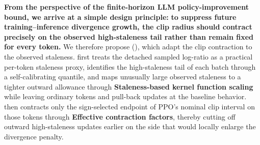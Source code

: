 \textbf{From the perspective of the finite-horizon LLM policy-improvement bound, we arrive at a simple design principle:} \textbf{{to suppress future training--inference divergence growth, the clip radius should contract precisely on the observed high-staleness tail rather than remain fixed for every token.}}
We therefore propose \satrfull{} (\textbf{\satr}), which adapt the clip contraction to the observed staleness. 
\satr{} first treats the detached sampled log-ratio as a practical per-token staleness proxy, identifies the high-staleness tail of each batch through a self-calibrating quantile, and maps unusually large observed staleness to a tighter outward allowance through \textbf{Staleness-based kernel function scaling} while leaving ordinary tokens and pull-back updates at the baseline behavior. 
\satr{} then contracts only the sign-selected endpoint of PPO's nominal clip interval on those tokens through \textbf{Effective contraction factors}, thereby cutting off outward high-staleness updates earlier on the side that would locally enlarge the divergence penalty.

